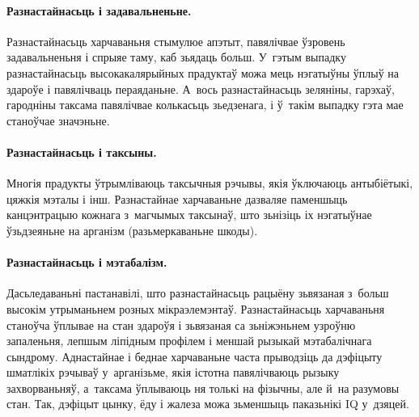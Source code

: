 \paragraph{Разнастайнасьць і задавальненьне.}
Разнастайнасьць харчаваньня стымулюе апэтыт, павялічвае ўзровень задавальненьня і спрыяе таму, каб зьядаць больш. У~гэтым выпадку разнастайнасьць высокакалярыйных прадуктаў можа мець нэгатыўны ўплыў на здароўе і павялічваць пераяданьне. А~вось разнастайнасьць зеляніны, гарэхаў, гародніны таксама павялічвае колькасьць зьедзенага, і ў~такім выпадку гэта мае станоўчае значэньне.

\paragraph{Разнастайнасьць і таксыны.}
Многія прадукты ўтрымліваюць таксычныя рэчывы, якія ўключаюць антыбіётыкі, цяжкія мэталы і інш. Разнастайнае харчаваньне дазваляе паменшыць канцэнтрацыю кожнага з~магчымых таксынаў, што зьнізіць іх нэгатыўнае ўзьдзеяньне на арганізм (разьмеркаваньне шкоды).


\paragraph{Разнастайнасьць і мэтабалізм.}
Дасьледаваньні пастанавілі, што разнастайнасьць рацыёну зьвязаная з~больш высокім утрыманьнем розных мікраэлемэнтаў. Разнастайнасьць харчаваньня станоўча ўплывае на стан здароўя і зьвязаная са зьніжэньнем узроўню запаленьня, лепшым ліпідным профілем і меншай рызыкай мэтабалічнага сындрому. Аднастайнае і беднае харчаваньне часта прыводзіць да дэфіцыту шматлікіх рэчываў у~арганізьме, якія істотна павялічваюць рызыку захворваньняў, а~таксама ўплываюць ня толькі на фізычны, але й~на разумовы стан. Так, дэфіцыт цынку, ёду і жалеза можа зьменшыць паказьнікі IQ у~дзяцей.

